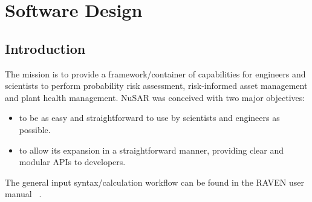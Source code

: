 \section{Software Design}
\subsection{Introduction}
The mission is to provide a framework/container of capabilities for 
engineers and scientists to perform probability risk assessment, risk-informed asset management and plant health management. 
NuSAR was conceived with two major objectives: 
\begin{itemize}
  \item  to be as easy and straightforward to use by scientists and engineers as possible. 
  \item to allow its expansion in a straightforward manner, providing clear and modular APIs  to developers.
\end{itemize}
The general input syntax/calculation workflow can be found in the RAVEN user manual ~\cite{RAVENuserManual}.





